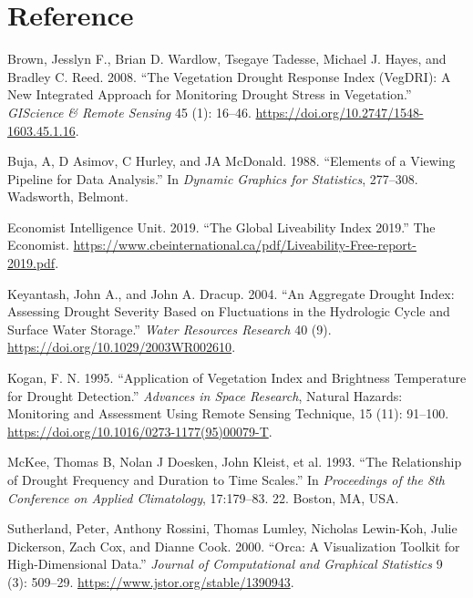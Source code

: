 \documentclass[
]{article}
\newlength{\cslhangindent}
\newlength{\cslentryspacingunit} %
\newenvironment{CSLReferences}[2] %
 {%
  \setlength{\parindent}{0pt}
  \ifodd #1
  \let\oldpar\par
  \def\par{\hangindent=\cslhangindent\oldpar}
  \fi
  \setlength{\parskip}{#2\cslentryspacingunit}
 }%
 {}
\begin{document}
\hypertarget{reference}{%
\section*{Reference}\label{reference}}

\hypertarget{refs}{}
\begin{CSLReferences}{1}{0}
\leavevmode{}%
Brown, Jesslyn F., Brian D. Wardlow, Tsegaye Tadesse, Michael J. Hayes,
and Bradley C. Reed. 2008. {``The {Vegetation} {Drought} {Response}
{Index} ({VegDRI}): {A} {New} {Integrated} {Approach} for {Monitoring}
{Drought} {Stress} in {Vegetation}.''} \emph{GIScience \& Remote
Sensing} 45 (1): 16--46.
\url{https://doi.org/10.2747/1548-1603.45.1.16}.

\leavevmode{}%
Buja, A, D Asimov, C Hurley, and JA McDonald. 1988. {``Elements of a
Viewing Pipeline for Data Analysis.''} In \emph{Dynamic Graphics for
Statistics}, 277--308. Wadsworth, Belmont.

\leavevmode{}%
Economist Intelligence Unit. 2019. {``The Global Liveability Index
2019.''} The Economist.
\url{https://www.cbeinternational.ca/pdf/Liveability-Free-report-2019.pdf}.

\leavevmode{}%
Keyantash, John A., and John A. Dracup. 2004. {``An Aggregate Drought
Index: {Assessing} Drought Severity Based on Fluctuations in the
Hydrologic Cycle and Surface Water Storage.''} \emph{Water Resources
Research} 40 (9). \url{https://doi.org/10.1029/2003WR002610}.

\leavevmode{}%
Kogan, F. N. 1995. {``Application of Vegetation Index and Brightness
Temperature for Drought Detection.''} \emph{Advances in Space Research},
Natural {Hazards}: {Monitoring} and {Assessment} {Using} {Remote}
{Sensing} {Technique}, 15 (11): 91--100.
\url{https://doi.org/10.1016/0273-1177(95)00079-T}.

\leavevmode{}%
McKee, Thomas B, Nolan J Doesken, John Kleist, et al. 1993. {``The
Relationship of Drought Frequency and Duration to Time Scales.''} In
\emph{Proceedings of the 8th Conference on Applied Climatology},
17:179--83. 22. Boston, MA, USA.

\leavevmode{}%
Sutherland, Peter, Anthony Rossini, Thomas Lumley, Nicholas Lewin-Koh,
Julie Dickerson, Zach Cox, and Dianne Cook. 2000. {``Orca: {A}
{Visualization} {Toolkit} for {High}-{Dimensional} {Data}.''}
\emph{Journal of Computational and Graphical Statistics} 9 (3): 509--29.
\url{https://www.jstor.org/stable/1390943}.


\end{CSLReferences}
\end{document}
